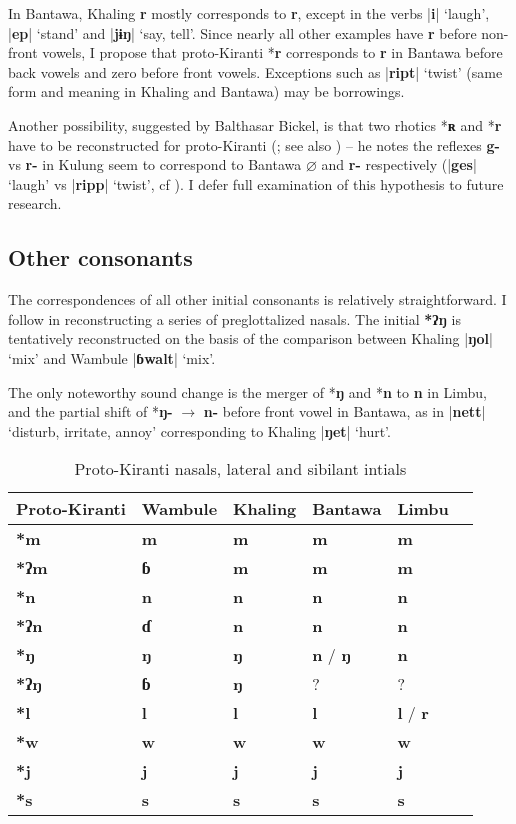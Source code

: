 \documentclass[oneside,a4paper,11pt]{article}
\newcommand{\ipa}[1]{\textbf{{\phon\mbox{#1}}}} %
\newcommand{\dhatu}[2]{|\ipa{#1}| `#2'}
\newcommand{\change}[2]{*\ipa{#1} $\rightarrow$ \ipa{#2}}
\begin{document}
In Bantawa, Khaling \ipa{r} mostly corresponds to \ipa{r}, except in the verbs \dhatu{i}{laugh}, \dhatu{ep}{stand} and \dhatu{jɨŋ}{say, tell}. Since nearly all other examples have \ipa{r} before non-front vowels, I propose that proto-Kiranti *\ipa{r} corresponds to \ipa{r} in Bantawa before back vowels and zero before front vowels. Exceptions such as \dhatu{ript}{twist} (same form and meaning in Khaling and Bantawa) may be borrowings.

Another possibility, suggested by Balthasar Bickel, is that two rhotics *\ipa{ʀ} and *\ipa{r} have to be reconstructed for proto-Kiranti (\citealt[75]{bickel15antipassive}; see also \citealt[34-36]{opgenort05jero}) -- he notes the reflexes \ipa{g-} vs \ipa{r-} in Kulung seem to correspond to Bantawa $\varnothing$ and \ipa{r-} respectively (\dhatu{ges}{laugh} vs \dhatu{ripp}{twist}, cf \citealt{tolsma06kulung}). I defer full examination of this hypothesis to future research.




\subsection{Other consonants}
The correspondences of all other initial consonants is relatively straightforward. I follow \citet{opgenort04implosives} in reconstructing a series of preglottalized nasals. The initial \ipa{*ʔŋ} is tentatively reconstructed on the basis of the comparison between Khaling \dhatu{ŋol}{mix} and Wambule \dhatu{ɓwalt}{mix}.

The only noteworthy sound change is the merger of *\ipa{ŋ} and *\ipa{n} to \ipa{n} in Limbu, and the partial shift of \change{ŋ-}{n-} before front vowel in Bantawa, as in \dhatu{nett}{disturb, irritate, annoy} corresponding to Khaling \dhatu{ŋet}{hurt}.

\begin{table}[H]
\caption{Proto-Kiranti nasals, lateral and sibilant intials} \centering \label{tab:nasals}
\begin{tabular}{llllll}
\toprule
Proto-Kiranti & Wambule & Khaling & Bantawa & Limbu \\
\midrule
\ipa{*m} & \ipa{m} & \ipa{m} & \ipa{m} & \ipa{m}  \\
\ipa{*ʔm} & \ipa{ɓ} & \ipa{m} & \ipa{m} & \ipa{m}  \\
\ipa{*n} & \ipa{n} & \ipa{n} & \ipa{n} & \ipa{n}  \\
\ipa{*ʔn} & \ipa{ɗ} & \ipa{n} & \ipa{n} & \ipa{n}  \\
\ipa{*ŋ} & \ipa{ŋ} & \ipa{ŋ} & \ipa{n} / \ipa{ŋ} & \ipa{n}  \\
\ipa{*ʔŋ} &  \ipa{ɓ}  & \ipa{ŋ} & ? &?  \\
\ipa{*l} & \ipa{l} & \ipa{l} & \ipa{l} & \ipa{l} / \ipa{r} \\
\ipa{*w} & \ipa{w} & \ipa{w} & \ipa{w} & \ipa{w} \\
\ipa{*j} & \ipa{j} & \ipa{j} & \ipa{j} & \ipa{j} \\
\ipa{*s} & \ipa{s} & \ipa{s} & \ipa{s} & \ipa{s}  \\
\bottomrule
\end{tabular}
\end{table}
\end{document}
